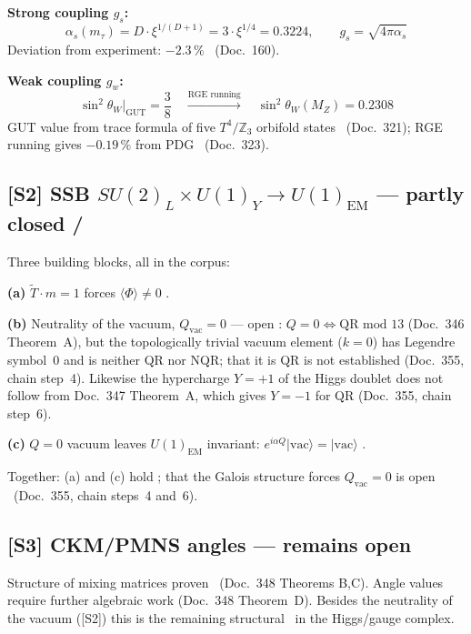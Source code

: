 \textbf{Strong coupling $g_s$:}
\begin{equation}
  \alpha_s(m_\tau) = D\cdot\xi^{1/(D+1)} = 3\cdot\xi^{1/4} = 0.3224,
  \qquad g_s = \sqrt{4\pi\alpha_s}
\end{equation}
Deviation from experiment: $-2.3\,\%$ \KM\ (Doc.~160).

\textbf{Weak coupling $g_w$:}
\begin{equation}
  \sin^2\theta_W\big|_\text{GUT} = \frac{3}{8}
  \quad\xrightarrow{\text{RGE running}}\quad
  \sin^2\theta_W(M_Z) = 0.2308
\end{equation}
GUT value from trace formula of five $T^4/\mathbb{Z}_3$ orbifold states
\BM\ (Doc.~321); RGE running gives $-0.19\,\%$ from PDG \KM\ (Doc.~323).

\subsection*{[S2] SSB $SU(2)_L\times U(1)_Y\to U(1)_\text{EM}$ --- partly closed \BM/\SM}

Three building blocks, all in the corpus:

\textbf{(a)} $\tilde{T}\cdot m=1$ forces $\langle\Phi\rangle \neq 0$ \BM.

\textbf{(b)} Neutrality of the vacuum, $Q_\text{vac}=0$ --- open \SM:
$Q=0 \iff \text{QR mod~13}$ (Doc.~346 Theorem~A), but the topologically trivial
vacuum element ($k=0$) has Legendre symbol~$0$ and is neither QR nor NQR; that it
is QR is not established (Doc.~355, chain step~4). Likewise the hypercharge
$Y=+1$ of the Higgs doublet does not follow from Doc.~347 Theorem~A, which gives
$Y=-1$ for QR (Doc.~355, chain step~6).

\textbf{(c)} $Q=0$ vacuum leaves $U(1)_\text{EM}$ invariant:
$e^{i\alpha Q}|\text{vac}\rangle = |\text{vac}\rangle$ \BM.

Together: (a) and (c) hold \BM; that the Galois structure forces
$Q_\text{vac}=0$ is open \SM\ (Doc.~355, chain steps~4 and~6).

\subsection*{[S3] CKM/PMNS angles --- remains open \SM}

Structure of mixing matrices proven \BM\ (Doc.~348 Theorems B,C).
Angle values require further algebraic work (Doc.~348 Theorem~D).
Besides the neutrality of the vacuum ([S2]) this is the remaining structural \SM\ in the Higgs/gauge complex.


